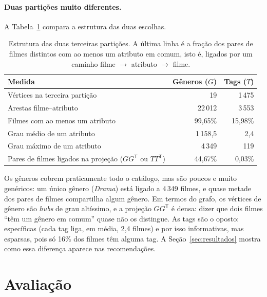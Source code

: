 \documentclass[12pt,a4paper]{article}
\theoremstyle{definition}
\begin{document}
\paragraph{Duas partições muito diferentes.}
A Tabela~\ref{tab:particoes} compara a estrutura das duas escolhas.

\begin{table}[ht]
\centering
\begin{tabular}{lrr}
\toprule
Medida & Gêneros ($G$) & Tags ($T$) \\
\midrule
Vértices na terceira partição & 19 & 1\,475 \\
Arestas filme--atributo & 22\,012 & 3\,553 \\
Filmes com ao menos um atributo & 99{,}65\% & 15{,}98\% \\
Grau médio de um atributo & 1\,158{,}5 & 2{,}4 \\
Grau máximo de um atributo & 4\,349 & 119 \\
Pares de filmes ligados na projeção ($GG^{\mathsf T}$ ou $TT^{\mathsf T}$) & 44{,}67\% & 0{,}03\% \\
\bottomrule
\end{tabular}
\caption{Estrutura das duas terceiras partições. A última linha é a
fração dos pares de filmes distintos com ao menos um atributo em comum,
isto é, ligados por um caminho filme $\to$ atributo $\to$ filme.}
\label{tab:particoes}
\end{table}

Os gêneros cobrem praticamente todo o catálogo, mas são poucos e muito
genéricos: um único gênero (\emph{Drama}) está ligado a 4\,349 filmes, e
quase metade dos pares de filmes compartilha algum gênero. Em termos do
grafo, os vértices de gênero são \emph{hubs} de grau altíssimo, e a
projeção $GG^{\mathsf T}$ é densa: dizer que dois filmes ``têm um gênero
em comum'' quase não os distingue. As tags são o oposto: específicas
(cada tag liga, em média, 2{,}4 filmes) e por isso informativas, mas
esparsas, pois só 16\% dos filmes têm alguma tag. A
Seção~\ref{sec:resultados} mostra como essa diferença aparece nas
recomendações.

\section{Avaliação}\label{sec:avaliacao}
\end{document}
